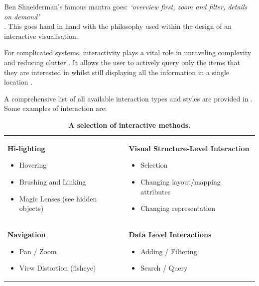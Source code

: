 Ben Shneiderman's famous mantra goes: \emph{`overview first, zoom and filter, details on demand'} \\ \citep{mantra}. This goes hand in hand with the philosophy used within the design of an interactive visualisation.

For complicated systems, interactivity plays a vital role in unraveling complexity and reducing clutter \citep{interaction1}. It allows the user to actively query only the items that they are interested in whilst still displaying all the information in a single location \citep{oneplace}. 

A comprehensive list of all available interaction types and styles are provided in \citep{ch6}. Some examples of interaction are:\\ 

\begin{table}[h]
    \centering
    \begin{tabular}{p{}p{}}
\textbf{Hi-lighting}
\begin{itemize}
\item Hovering
\item Brushing and Linking
\item Magic Lenses (see hidden objects)
\end{itemize}
&
\textbf{Visual Structure-Level Interaction}
\begin{itemize}
\item Selection
\item Changing layout/mapping attributes
\item Changing representation
\end{itemize}
\\
\textbf{Navigation}
\begin{itemize}
\item Pan / Zoom
\item View Distortion (fisheye)
\end{itemize}
&
\textbf{Data Level Interactions}
\begin{itemize}
\item Adding / Filtering
\item Search / Query
\end{itemize}

\end{tabular}
    \caption{\textbf{A selection of interactive methods.}}
    \label{tab:interactive}
\end{table}

